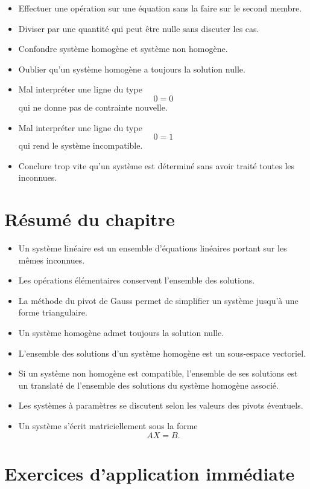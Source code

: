 \documentclass[11pt,a4paper]{article}
\theoremstyle{remark}
\begin{document}
\begin{itemize}
    \item Effectuer une opération sur une équation sans la faire sur le second membre.
    \item Diviser par une quantité qui peut être nulle sans discuter les cas.
    \item Confondre système homogène et système non homogène.
    \item Oublier qu’un système homogène a toujours la solution nulle.
    \item Mal interpréter une ligne du type
    \[
    0=0
    \]
    qui ne donne pas de contrainte nouvelle.
    \item Mal interpréter une ligne du type
    \[
    0=1
    \]
    qui rend le système incompatible.
    \item Conclure trop vite qu’un système est déterminé sans avoir traité toutes les inconnues.
\end{itemize}

\section{Résumé du chapitre}

\begin{itemize}
    \item Un système linéaire est un ensemble d’équations linéaires portant sur les mêmes inconnues.
    \item Les opérations élémentaires conservent l’ensemble des solutions.
    \item La méthode du pivot de Gauss permet de simplifier un système jusqu’à une forme triangulaire.
    \item Un système homogène admet toujours la solution nulle.
    \item L’ensemble des solutions d’un système homogène est un sous-espace vectoriel.
    \item Si un système non homogène est compatible, l’ensemble de ses solutions est un translaté de l’ensemble des solutions du système homogène associé.
    \item Les systèmes à paramètres se discutent selon les valeurs des pivots éventuels.
    \item Un système s’écrit matriciellement sous la forme
    \[
    AX=B.
    \]
\end{itemize}

\section*{Exercices d’application immédiate}
\end{document}
